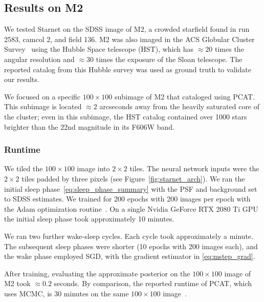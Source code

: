 \subsection{Results on M2}
We tested Starnet on the SDSS image of M2, a crowded starfield found in run 2583, camcol 2, and field 136.
M2 was also imaged in the ACS Globular Cluster Survey~\cite{Sarajedini_2007}
using the Hubble Space telescope (HST),
which has $\approx20$ times the angular resolution and $\approx30$ times the exposure of the Sloan telescope. The reported catalog from this Hubble survey was used as ground truth to 
validate our results.

We focused on a specific $100 \times 100$ subimage of M2 that \cite{Portillo_2017, Feder_2019} cataloged using PCAT.
This subimage is located $\approx2$ arcseconds away from the heavily saturated core of the cluster;
even in this subimage, the HST catalog contained over 1000 stars brighter than the 22nd magnitude in its F606W band.

\subsubsection{Runtime} 
\label{sec:runtime}
We tiled the $100\times 100$ image into $2\times 2$ tiles. The neural network inputs were the $2\times2$ tiles padded by three pixels (see Figure~\ref{fig:starnet_arch}). 
We ran the initial sleep phase~\eqref{eq:sleep_phase_summary}
with the PSF and background set to SDSS estimates. We trained for 200 epochs with 200 images per epoch with  
the Adam optimization routine~\cite{kingma2014adam}. 
On a single Nvidia GeForce RTX 2080 Ti GPU 
the initial sleep phase took approximately 10 minutes. 

We ran two further wake-sleep cycles. Each cycle took approximately a minute. The subsequent sleep phases were shorter (10 epochs with 200 images each), and the wake phase employed SGD, with the gradient estimator in \eqref{eq:mstep_grad}. 

After training, evaluating the approximate posterior on the $100 \times 100$ image of M2 took $\approx 0.2$ seconds. 
By comparison, the reported runtime of PCAT, which uses MCMC, is 30 minutes on the same $100 \times 100$ image~\cite{Feder_2019}. 

